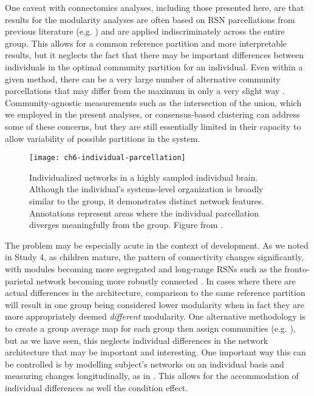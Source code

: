 One caveat with connectomics analyses, including those presented here, are that results for the modularity analyses are often based on RSN parcellations from previous literature (e.g. \cite{Power2011}) and are applied indiscriminately across the entire group. This allows for a common reference partition and more interpretable results, but it neglects the fact that there may be important differences between individuals in the optimal community partition for an individual. Even within a given method, there can be a very large number of alternative community parcellations that may differ from the maximum in only a very slight way \citep{Good2010}. Community-agnostic measurements such as the intersection of the union, which we employed in the present analyses, or consensus-based clustering can address some of these concerns, but they are still essentially limited in their capacity to allow variability of possible partitions in the system. 

\begin{figure}[t]
	\centering
	\texttt{[image: ch6-individual-parcellation]}
	\caption[Individualized networks in a highly sampled individual brain]{Individualized networks in a highly sampled individual brain. Although the individual's systems-level organization is broadly similar to the group, it demonstrates distinct network features. Annotations represent areas where the individual parcellation diverges meaningfully from the group. Figure from \citep{Laumann2015}.}
	\label{fig:ch6-individual-parcellation}
\end{figure}

The problem may be especially acute in the context of development. As we noted in Study 4, as children mature, the pattern of connectivity changes significantly, with modules becoming more segregated and long-range RSNs such as the fronto-parietal network becoming more robustly connected \citep{Cao2016}. In cases where there are actual differences in the architecture, comparison to the same reference partition will result in one group being considered lower modularity when in fact they are more appropriately deemed \textit{different} modularity. One alternative methodology is to create a group average map for each group then assign communities (e.g. \cite{Chan2014}), but as we have seen, this neglects individual differences in the network architecture that may be important and interesting. One important way this can be controlled is by modelling subject's networks on an individual basis and measuring changes longitudinally, as in \cite{Bassett2015}. This allows for the accommodation of individual differences as well the condition effect.


